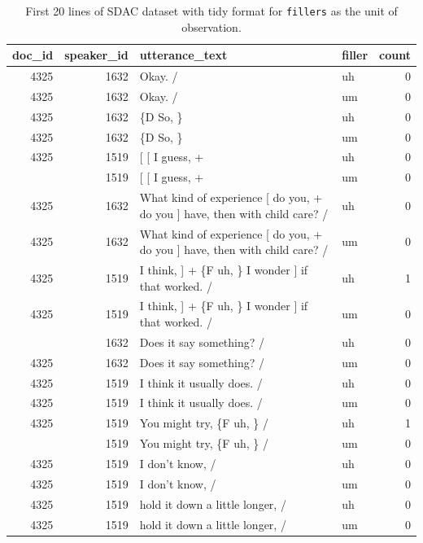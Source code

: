 \documentclass[
  letterpaper,
]{latex/krantz}
\begin{document}
\hypertarget{tbl-td-sdac-count-disfluencies-longer-show}{}
\begin{table}
\caption{\label{tbl-td-sdac-count-disfluencies-longer-show}First 20 lines of SDAC dataset with tidy format for \texttt{fillers} as
the unit of observation. }\tabularnewline

\centering
\begin{tabular}{rrllr}
\toprule
doc\_id & speaker\_id & utterance\_text & filler & count\\
\midrule
4325 & 1632 & Okay.  / & uh & 0\\
4325 & 1632 & Okay.  / & um & 0\\
4325 & 1632 & \{D So, \} & uh & 0\\
4325 & 1632 & \{D So, \} & um & 0\\
4325 & 1519 & {}[ [ I guess, + & uh & 0\\
\addlinespace
4325 & 1519 & {}[ [ I guess, + & um & 0\\
4325 & 1632 & What kind of experience [ do you, + do you ] have, then with child care? / & uh & 0\\
4325 & 1632 & What kind of experience [ do you, + do you ] have, then with child care? / & um & 0\\
4325 & 1519 & I think, ] + \{F uh, \} I wonder ] if that worked. / & uh & 1\\
4325 & 1519 & I think, ] + \{F uh, \} I wonder ] if that worked. / & um & 0\\
\addlinespace
4325 & 1632 & Does it say something? / & uh & 0\\
4325 & 1632 & Does it say something? / & um & 0\\
4325 & 1519 & I think it usually does.  / & uh & 0\\
4325 & 1519 & I think it usually does.  / & um & 0\\
4325 & 1519 & You might try, \{F uh, \}  / & uh & 1\\
\addlinespace
4325 & 1519 & You might try, \{F uh, \}  / & um & 0\\
4325 & 1519 & I don't know,  / & uh & 0\\
4325 & 1519 & I don't know,  / & um & 0\\
4325 & 1519 & hold it down a little longer,  / & uh & 0\\
4325 & 1519 & hold it down a little longer,  / & um & 0\\
\bottomrule
\end{tabular}
\end{table}
\end{document}
